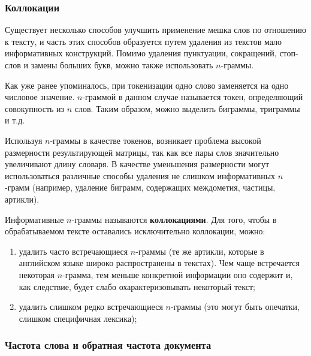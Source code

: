 \documentclass[bachelor, och, coursework]{SCWorks}
\begin{document}
        \subsubsection{Коллокации}

            Существует несколько способов улучшить применение мешка слов по
            отношению к тексту, и часть этих способов образуется путем удаления
            из текстов мало информативных конструкций. Помимо удаления
            пунктуации, сокращений, стоп-слов и замены больших букв, можно также
            использовать $n$-граммы.
            
            Как уже ранее упоминалось, при токенизации одно слово заменяется на
            одно числовое значение. $n$-граммой в данном случае называется
            токен, определяющий совокупность из $n$ слов. Таким образом, можно
            выделить биграммы, триграммы и т.д.

            Используя $n$-граммы в качестве токенов, возникает проблема высокой
            размерности результирующей матрицы, так как все пары слов
            значительно увеличивают длину словаря. В качестве уменьшения
            размерности могут использоваться различные способы удаления не
            слишком информативных $n$-грамм (например, удаление биграмм,
            содержащих междометия, частицы, артикли).

            Информативные $n$-граммы называются \textbf{коллокациями}. Для того,
            чтобы в обрабатываемом тексте оставались исключительно коллокации,
            можно:

            \begin{enumerate}
                \item удалить часто встречающиеся $n$-граммы (те же артикли,
                которые в английском языке широко распространены в текстах). Чем
                чаще встречается некоторая $n$-грамма, тем меньше конкретной
                информации оно содержит и, как следствие, будет слабо
                охарактеризовывать некоторый текст;
                \item удалить слишком редко встречающиеся $n$-граммы (это могут
                быть опечатки, слишком специфичная лексика);
            \end{enumerate}

        \subsubsection{Частота слова и обратная частота документа}
\end{document}
